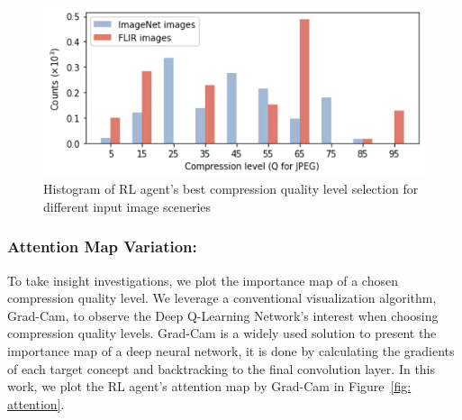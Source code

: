 \begin{figure}[htb]
    \includegraphics[width=\linewidth]{figures/dataset_change.pdf}
    \caption{Histogram of RL agent's best compression quality level selection for different input image sceneries}
    \label{fig: dataset_change}
\end{figure}

\subsubsection{\textbf{Attention Map Variation:}}
\label{subsec: attention map}

To take insight investigations, we plot the importance map of a chosen compression quality level. We leverage a conventional visualization algorithm, Grad-Cam, to observe the Deep Q-Learning Network's interest when choosing compression quality levels. Grad-Cam is a widely used solution to present the importance map of a deep neural network, it is done by calculating the gradients of each target concept and backtracking to the final convolution layer. In this work, we plot the RL agent's attention map by Grad-Cam in Figure~\ref{fig: attention}. %

